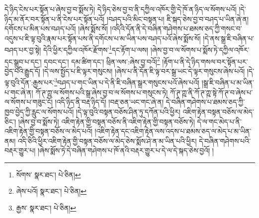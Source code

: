 དེ་ཉིད་ངེས་པར་སྟོན་པ་ཞེས་བྱ་བ་སྨོས་ཏེ། དེ་ཉིད་ཅེས་བྱ་བ་ནི་དཀྱིལ་འཁོར་གྱི་དེ་ཁོ་ན་ཉིད་ལ་སོགས་པའོ། །དེ་ཉིད་མ་ནོར་བར་སྟོན་པ་ནི་ངེས་པར་སྟོན་པའོ། །བཤད་པའི་མིང་བསྟན་པ། ཇི་སྐད་ཅེས་བྱ་བ་བཤད་པ་ཡིན་ཞེ་ན། དགོངས་པ་མིན་པས་བཤད་པའོ། །ཞེས་སྨོས་སོ། །འདིའི་དོན་ནི་དེ་བཞིན་གཤེགས་པ་ཐམས་ཅད་ཀྱི་གསང་བ་འདུས་པ་ཇི་ལྟ་བུའི་རྣམ་པར་སྟོན་པས་ནི་དགོངས་པ་མ་ཡིན་པས་བཤད་པའོ་ཞེས་སྨོས་སོ། །དེ་ནས་སྒྲ་ཇི་བཞིན་པ་བཤད་པར་བྱ་སྟེ། དེའི་ཕྱིར་དཀྱིལ་འཁོར་རྫོགས་\footnote{སོགས་  སྣར་ཐང་།  པེ་ཅིན། }དང་རྟོག་པ་ལས། །ཞེས་བྱ་བ་ལ་སོགས་པ་སྨོས་ཏེ་དཀྱིལ་འཁོར་དང་སྒྲུབ་པ་དང་། དབང་དང་། དམ་ཚིག་དང་། ཕྲིན་ལས་:ཞེས་བྱ་བའོ།\footnote{ཞེས་པའོ།  སྣར་ཐང་།  པེ་ཅིན། } །རྟོག་པ་ནི་དེ་ཉིད་གསལ་བར་སྟོན་པར་བྱེད་པའི་རྒྱུད་དོ། །དེ་ལས་སྤྱོད་པ་ཇི་ལྟར་གསུངས། །ཞེས་པ་ནི་དོན་ཇི་ལྟ་བར་སྒྲ་ཡང་དེ་ལྟར་གསུངས་ཞེས་པའོ། །དེ་ལྟ་བུའི་དོན་:རྒྱས་པར་\footnote{རྒྱས་  སྣར་ཐང་།  པེ་ཅིན། }བཤད་པ་གང་ཡིན་པ་དེ་ནི་ཇི་བཞིན་སྒྲར་གསུངས་པའོ་ཞེས་པའོ། །སྒྲ་ཇི་བཞིན་པ་མ་ཡིན་པ་གང་ཞེ་ན། ཀོ་ཊ་ཀྵ་ལ་སོགས་པའི་སྒྲ་ཞེས་བྱ་བ་ལ་སོགས་པ་གསུངས་ཏེ། ཀོ་ཊ་ཀྵ་ནི་ཀོ་ཊ་ཀྵ་སྟེ་ཀོ་ཊ་བ་ཞེས་པ་ལ་སོགས་པ་གཟུང་ངོ། །འདི་ཉིད་ནི་བརྡ་ཉིད་དོ། །བརྡ་ཅན་ཡང་གང་ཞེ་ན། དེ་བཞིན་གཤེགས་པ་ཐམས་ཅད་ཀྱི་ཁྱབ་བྱེད་ཀྱི་རླུང་ལ་སོགས་པའོ། །དེ་ལྟ་བུའི་བསྟན་བཅོས་ཤིན་ཏུ་དཀོན་པའི་ཕྱིར། འཇིག་རྟེན་བསྟན་བཅོས་ལ་མེད་ཅིང་། །ཞེས་བྱ་བ་སྨོས་ཏེ། འཇིག་རྟེན་གྱི་བསྟན་བཅོས་ནི་འཇིག་རྟེན་གྱི་བསྟན་བཅོས་ཏེ། དེ་ལ་གང་མེད་པ་ནི་འཇིག་རྟེན་གྱི་བསྟན་བཅོས་ལ་མེད་པའོ། །འཇིག་རྟེན་དང་འཇིག་རྟེན་ལས་འདས་པ་ཐམས་ཅད་ལ་མེད་པ་མ་ཡིན་ནམ། འདི་ཅིའི་ཕྱིར་འཇིག་རྟེན་གྱི་བསྟན་བཅོས་ལ་མེད་ཅེས་སྨོས་ཤེ་ན་མ་ཡིན་པའི་ཕྱིར། དེ་བཞིན་གཤེགས་པའི་བརྡར་གྱུར་པ། །ཞེས་སྨོས་ཏེ་དེ་བཞིན་གཤེགས་པ་ཁོ་ནའི་བརྡར་གྱུར་པ་དེ་ལ་དེ་སྐད་ཅེས་བྱའོ། །
